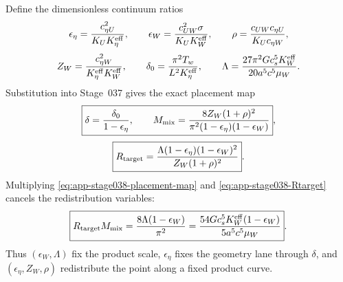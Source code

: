 Define the dimensionless continuum ratios
\begin{equation}
\label{eq:app-stage038-ratios-a}
\epsilon_\eta=\frac{c_{\eta U}^2}{K_UK_\eta^{\rm eff}},
\qquad
\epsilon_W=\frac{c_{UW}^2\sigma}{K_UK_W^{\rm eff}},
\qquad
\rho=\frac{c_{UW}c_{\eta U}}{K_Uc_{\eta W}},
\end{equation}
\begin{equation}
\label{eq:app-stage038-ratios-b}
Z_W=\frac{c_{\eta W}^2}{K_\eta^{\rm eff}K_W^{\rm eff}},
\qquad
\delta_0=\frac{\pi^2T_w}{L^2K_\eta^{\rm eff}},
\qquad
\Lambda=\frac{27\pi^2Gc_s^5K_W^{\rm eff}}{20a^5c^5\mu_W}.
\end{equation}
Substitution into Stage~037 gives the exact placement map
\begin{equation}
\label{eq:app-stage038-placement-map}
\boxed{
\delta=\frac{\delta_0}{1-\epsilon_\eta},
\qquad
M_{\rm mix}=\frac{8Z_W(1+\rho)^2}{\pi^2(1-\epsilon_\eta)(1-\epsilon_W)}},
\end{equation}
\begin{equation}
\label{eq:app-stage038-Rtarget}
\boxed{
R_{\rm target}=\frac{\Lambda(1-\epsilon_\eta)(1-\epsilon_W)^2}{Z_W(1+\rho)^2}}.
\end{equation}
Multiplying \eqref{eq:app-stage038-placement-map} and \eqref{eq:app-stage038-Rtarget} cancels the redistribution variables:
\begin{equation}
\label{eq:app-stage038-product-law}
\boxed{
R_{\rm target}M_{\rm mix}
=\frac{8\Lambda(1-\epsilon_W)}{\pi^2}
=\frac{54Gc_s^5K_W^{\rm eff}(1-\epsilon_W)}{5a^5c^5\mu_W}}.
\end{equation}
Thus \((\epsilon_W,\Lambda)\) fix the product scale, \(\epsilon_\eta\) fixes the geometry lane through \(\delta\), and \((\epsilon_\eta,Z_W,\rho)\) redistribute the point along a fixed product curve.


